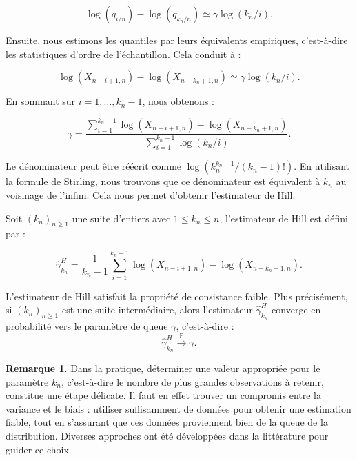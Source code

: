 \documentclass{article}
\theoremstyle{plain}
\theoremstyle{definition}
\newtheorem{remark}[definition]{Remarque}
\theoremstyle{plain}
\begin{document}
\[
\log(q_{i/n}) - \log(q_{k_n/n}) \simeq \gamma \log(k_n/i).
\]

Ensuite, nous estimons les quantiles par leurs équivalents empiriques, c'est-à-dire les statistiques d'ordre de l'échantillon. Cela conduit à :

\[
\log(X_{n - i + 1, n}) - \log(X_{n - k_n + 1, n}) \simeq \gamma \log(k_n / i).
\]

En sommant sur \(i = 1, \ldots, k_n - 1\), nous obtenons :

\[
\gamma = \frac{\sum_{i=1}^{k_n - 1} \log(X_{n - i + 1, n}) - \log(X_{n - k_n + 1, n})}{\sum_{i=1}^{k_n - 1} \log(k_n / i)}.
\]

Le dénominateur peut être réécrit comme \(\log(k_n^{k_n - 1}/(k_n - 1)!)\). En utilisant la formule de Stirling, nous trouvons que ce dénominateur est équivalent à \(k_n\) au voisinage de l'infini. Cela nous permet d'obtenir l'estimateur de Hill.

Soit $(k_n)_{n \geq 1}$ une suite d'entiers avec $1 \leq k_n \leq n$, l’estimateur de Hill est défini par :

\[
\hat{\gamma}^{H}_{k_n} = \frac{1}{k_n - 1} \sum_{i=1}^{k_n - 1} \log(X_{n - i + 1, n}) - \log(X_{n - k_n + 1, n}).
\]

L’estimateur de Hill satisfait la propriété de consistance faible. Plus précisément, si $(k_n)_{n \geq 1}$ est une suite intermédiaire, alors l’estimateur $\hat{\gamma}^{H}_{k_n}$ converge en probabilité vers le paramètre de queue $\gamma$, c’est-à-dire :
\[
\hat{\gamma}^{H}_{k_n} \xrightarrow{\mathbb{P}} \gamma.
\]

\begin{remark}
	Dans la pratique, déterminer une valeur appropriée pour le paramètre $k_n$, c’est-à-dire le nombre de plus grandes observations à retenir, constitue une étape délicate. Il faut en effet trouver un compromis entre la variance et le biais : utiliser suffisamment de données pour obtenir une estimation fiable, tout en s’assurant que ces données proviennent bien de la queue de la distribution. Diverses approches ont été développées dans la littérature pour guider ce choix.
\end{remark}
\end{document}
